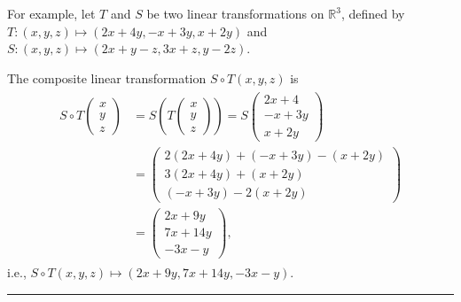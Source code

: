 \documentclass[letterpaper,10pt,english]{jupyterBook}
\begin{document}
\sphinxAtStartPar
For example, let \(T\) and \(S\) be two linear transformations on \(\mathbb{R}^3\), defined by \(T:(x, y, z) \mapsto (2 x + 4 y, -x + 3 y, x + 2 y)\) and \(S:(x, y, z) \mapsto (2x + y - z, 3x + z, y - 2z)\).

\sphinxAtStartPar
The composite linear transformation \(S \circ T(x, y, z)\) is
\begin{equation*}
\begin{split} \begin{align*}
    S \circ T\begin{pmatrix} x \\ y \\ z \end{pmatrix} &=
    S \left( T\begin{pmatrix} x \\ y \\ z \end{pmatrix} \right)
    = S \begin{pmatrix} 2 x + 4 \\ - x + 3y \\ x + 2 y \end{pmatrix} \\
    &= \begin{pmatrix}
        2(2 x + 4 y) + (-x + 3 y) - (x + 2 y) \\
        3(2 x + 4 y) + (x + 2 y) \\
        (-x + 3 y) - 2(x + 2 y)
    \end{pmatrix} \\
    &= \begin{pmatrix} 2 x + 9 y \\ 7 x + 14 y \\ -3 x - y \end{pmatrix},
\end{align*} \end{split}
\end{equation*}
\sphinxAtStartPar
i.e., \(S \circ T(x,y , z) \mapsto (2x + 9y, 7x + 14y, -3x - y)\).


\bigskip\hrule\bigskip
\end{document}
